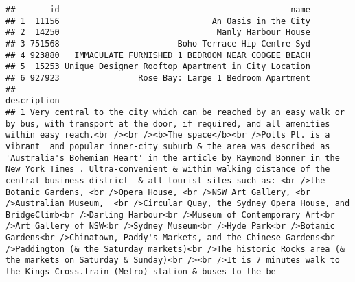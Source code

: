 \documentclass[
]{article}
\begin{document}
\begin{verbatim}
##       id                                               name
## 1  11156                               An Oasis in the City
## 2  14250                                Manly Harbour House
## 3 751568                        Boho Terrace Hip Centre Syd
## 4 923880   IMMACULATE FURNISHED 1 BEDROOM NEAR COOGEE BEACH
## 5  15253 Unique Designer Rooftop Apartment in City Location
## 6 927923                Rose Bay: Large 1 Bedroom Apartment
##                                                                                                                                                                                                                                                                                                                                                                                                                                                                                                                                                                                                                                                                                                                                                                                                                                                                                                                                                                                                                                description
## 1 Very central to the city which can be reached by an easy walk or by bus, with transport at the door, if required, and all amenities within easy reach.<br /><br /><b>The space</b><br />Potts Pt. is a vibrant  and popular inner-city suburb & the area was described as 'Australia's Bohemian Heart' in the article by Raymond Bonner in the New York Times . Ultra-convenient & within walking distance of the central business district  & all tourist sites such as: <br />the Botanic Gardens, <br />Opera House, <br />NSW Art Gallery, <br />Australian Museum,  <br />Circular Quay, the Sydney Opera House, and BridgeClimb<br />Darling Harbour<br />Museum of Contemporary Art<br />Art Gallery of NSW<br />Sydney Museum<br />Hyde Park<br />Botanic Gardens<br />Chinatown, Paddy's Markets, and the Chinese Gardens<br />Paddington (& the Saturday markets)<br />The historic Rocks area (& the markets on Saturday & Sunday)<br /><br />It is 7 minutes walk to the Kings Cross.train (Metro) station & buses to the be

\end{verbatim}
\end{document}
